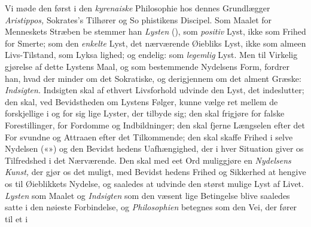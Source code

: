 Vi møde den først i den \emph{kyrenaiske} Philosophie hos
dennes Grundlægger \emph{Aristippos,} Sokrates's Tilhører og So\-%
phistikens Discipel. Som Maalet for Menneskets Stræben be\-%
stemmer han \emph{Lysten} (), som \emph{positiv} Lyst, ikke som
Frihed for Smerte; som den \emph{enkelte} Lyst, det nærværende
Øiebliks Lyst, ikke som almeen Livs-Tilstand, som Lyksa\-%
lighed; og endelig: som \emph{legemlig} Lyst. Men til Virkelig\-%
gjørelse af dette Lystens Maal, og som bestemmende Nydelsens
Form, fordrer han, hvad der minder om det Sokratiske, og
derigjennem om det alment Græske: \emph{Indsigten.} Indsigten
skal af ethvert Livsforhold udvinde den Lyst, det indeslutter;
den skal, ved Bevidstheden om Lystens Følger, kunne vælge
ret mellem de forskjellige i og for sig lige Lyster, der tilbyde
sig; den skal frigjøre for falske Forestillinger, for Fordomme
og Indbildninger; den skal fjerne Længselen efter det For\-%
svundne og Attraaen efter det Tilkommende; den skal skaffe
Frihed i selve Nydelsen («») og den Bevidst\-%
hedens Uafhængighed, der i hver Situation giver os Tilfredshed
i det Nærværende. Den skal med eet Ord muliggjøre en
\emph{Nydelsens Kunst,} der gjør os det muligt, med Bevidst\-%
hedens Frihed og Sikkerhed at hengive os til Øieblikkets
Nydelse, og saaledes at udvinde den størst mulige Lyst af
Livet. \emph{Lysten} som Maalet og \emph{Indsigten} som den væsent\-%
lige Betingelse blive saaledes satte i den nøieste Forbindelse,
og \emph{Philosophien} betegnes som den Vei, der fører til et i
